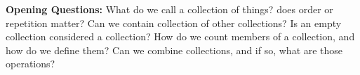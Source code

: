 \begin{greenbox}
    \textbf{Opening Questions:} What do we call a collection of things?
    does order or repetition matter? Can we contain collection of other collections? Is an empty collection
    considered a collection? How do we count members of a collection, and how do we define them? Can we
    combine collections, and if so, what are those operations?
\end{greenbox}